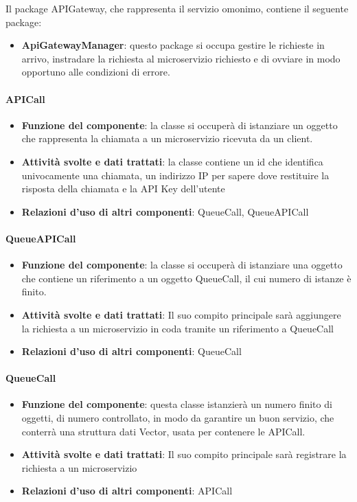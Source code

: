 Il package APIGateway, che rappresenta il servizio omonimo, contiene il seguente package:
\begin{itemize}
	\item \textbf{ApiGatewayManager}: questo package si occupa gestire le richieste in arrivo, instradare la richiesta al microservizio richiesto e di ovviare in modo opportuno alle condizioni di errore.
\end{itemize}

\paragraph{APICall}
\begin{itemize}
	\item \textbf{Funzione del componente}: la classe si occuper\`{a} di istanziare un oggetto che rappresenta la chiamata a un microservizio ricevuta da un client.
	\item \textbf{Attivit\`{a} svolte e dati trattati}: la classe contiene un id che identifica univocamente una chiamata, un indirizzo IP per sapere dove restituire la risposta della chiamata e la API Key dell'utente
	\item \textbf{Relazioni d'uso di altri componenti}: QueueCall, QueueAPICall
\end{itemize}

\paragraph{QueueAPICall}
\begin{itemize}
	\item \textbf{Funzione del componente}: la classe si occuper\`{a} di istanziare una oggetto che contiene un riferimento a un oggetto QueueCall, il cui numero di istanze \`{e} finito. 
	\item \textbf{Attivit\`{a} svolte e dati trattati}:  Il suo compito principale sar\`{a} aggiungere la richiesta a un microservizio in coda tramite un riferimento a QueueCall
	\item \textbf{Relazioni d'uso di altri componenti}: QueueCall
\end{itemize}

\paragraph{QueueCall}
\begin{itemize}
	\item \textbf{Funzione del componente}: questa classe istanzier\`{a} un numero finito di oggetti, di numero controllato, in modo da garantire un buon servizio, che conterr\`{a} una struttura dati Vector, usata per contenere le APICall.
	\item \textbf{Attivit\`{a} svolte e dati trattati}:  Il suo compito principale sar\`{a} registrare la richiesta a un microservizio 
	\item \textbf{Relazioni d'uso di altri componenti}: APICall
\end{itemize}

